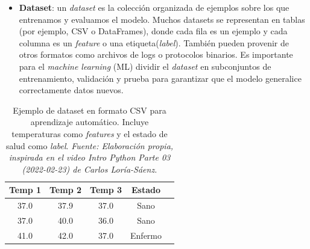 \documentclass[11pt]{article} %
\begin{document}
\begin{itemize}
    \item \textbf{Dataset}: un \textit{dataset} es la colección organizada de ejemplos sobre los que entrenamos y evaluamos el modelo. Muchos datasets se representan en tablas (por ejemplo, CSV o DataFrames), donde cada fila es un ejemplo y cada columna es un \textit{feature} o una etiqueta(\textit{label}). También pueden provenir de otros formatos como archivos de logs o protocolos binarios. Es importante para el \textit{machine learning} (ML) dividir el \textit{dataset} en subconjuntos de entrenamiento, validación y prueba para garantizar que el modelo generalice correctamente datos nuevos.
\end{itemize}

\begin{table}[h]
\centering
\caption{Ejemplo de dataset en formato CSV para aprendizaje automático. Incluye temperaturas como \textit{features} y el estado de salud como \textit{label}. \textit{Fuente: Elaboración propia, inspirada en el video \textit{Intro Python Parte 03 (2022-02-23)} de Carlos Loría-Sáenz.}}

\label{tab:ml_dataset_example}
\begin{tabular}{|c|c|c|c|c|}
\hline
\textbf{Temp 1} & \textbf{Temp 2} & \textbf{Temp 3} & \textbf{Estado} \\
\hline
37.0 & 37.9 & 37.0 & Sano \\
37.0 & 40.0 & 36.0 & Sano \\
41.0 & 42.0 & 37.0 & Enfermo \\
\hline
\end{tabular}
\end{table}
\vspace{8pt}
\end{document}
